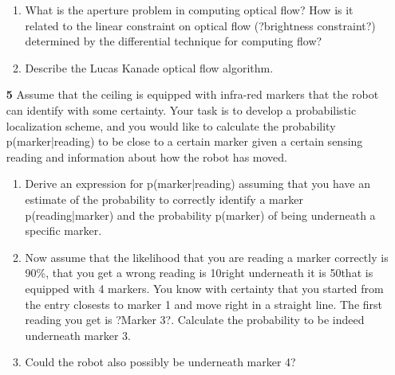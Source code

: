 \documentclass[11pt]{article}
\begin{document}
\begin{enumerate}
\begin{enumerate}
			\item What is the aperture problem in computing optical flow? How is it related to the linear
			constraint on optical flow (?brightness constraint?) determined by the differential technique for
			computing flow?
			
			\item Describe the Lucas Kanade optical flow algorithm.
		\end{enumerate}
		
	\item[\textbf{5}] 
		Assume that the ceiling is equipped with infra-red markers that the robot can identify with
		some certainty. Your task is to develop a probabilistic localization scheme, and you would like
		to calculate the probability p(marker|reading) to be close to a certain marker given a certain
		sensing reading and information about how the robot has moved. 	
		
		\begin{enumerate} 
			\item Derive an expression
				for p(marker|reading) assuming that you have an estimate of the probability to correctly identify
				a marker p(reading|marker) and the probability p(marker) of being underneath a specific
				marker.
				
			\item Now assume that the likelihood that you are reading a marker correctly is 90\%, that you
			get a wrong reading is 10right underneath it is 50that is equipped with 4 markers. You know
			with certainty that you started from the entry closests to marker 1 and move right in a straight
			line. The first reading you get is ?Marker 3?. Calculate the probability to be indeed underneath
			marker 3.
			
			\item Could the robot also possibly be underneath marker 4?
		\end{enumerate}
	\end{enumerate}	
\end{document}
